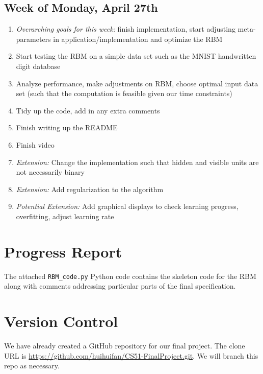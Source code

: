 \documentclass[12pt]{article}
\begin{document}
\subsection{Week of Monday, April 27th}
\begin{enumerate}
  \item \textit{Overarching goals for this week:} finish implementation, start adjusting meta-parameters in application/implementation and optimize the RBM
  \item Start testing the RBM on a simple data set such as the MNIST handwritten digit database
  \item Analyze performance, make adjustments on RBM, choose optimal input data set (such that the computation is feasible given our time constraints)
  \item Tidy up the code, add in any extra comments
  \item Finish writing up the README
  \item Finish video
  \item \textit{Extension:} Change the implementation such that hidden and visible units are not necessarily binary
  \item \textit{Extension:} Add regularization to the algorithm
  \item \textit{Potential Extension:} Add graphical displays to check learning progress, overfitting, adjust learning rate
\end{enumerate}


\section{Progress Report}
The attached \texttt{RBM\_code.py} Python code contains the skeleton code for the RBM along with comments addressing particular parts of the final specification.


\section{Version Control}
We have already created a GitHub repository for our final project. The clone URL is \url{https://github.com/huihuifan/CS51-FinalProject.git}. We will branch this repo as necessary. 
\end{document}
